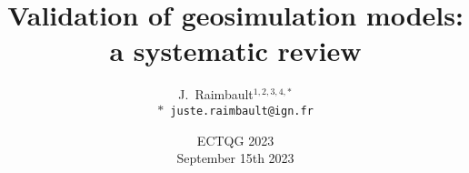 \documentclass[english,11pt]{beamer}
\begin{document}
\title{Validation of geosimulation models: a systematic review}

\author{J.~Raimbault$^{1,2,3,4,\ast}$\\
\texttt{$\ast$ juste.raimbault@ign.fr}
}




\date{ECTQG 2023\\\smallskip
September 15th 2023
}

\frame{\maketitle}




\end{document}
